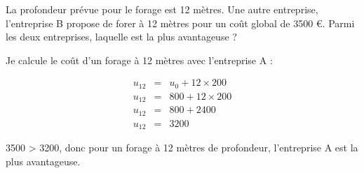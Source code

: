 \documentclass[a4paper,11pt]{exam}
\begin{document}
\begin{questions}
	
	\question La profondeur prévue pour le forage est 12 mètres. Une autre entreprise, l'entreprise B propose de forer à 12 mètres pour un coût global de \num{3500} €. Parmi les deux entreprises, laquelle est la plus avantageuse ?
		\begin{solution}
			Je calcule le coût d'un forage à 12 mètres avec l'entreprise A :
			
			\begin{eqnarray*}
				u_{12} &=& u_0 + 12 \times 200 \\
				u_{12} &=& 800 + 12 \times 200 \\
				u_{12} &=& 800 + 2400 \\
				u_{12} &=& 3200 
			\end{eqnarray*}
		
		3500 > 3200, donc pour un forage à 12 mètres de profondeur, l'entreprise A est la plus avantageuse.
		\end{solution}
	
\end{questions}
	\label{LastPage}
	
\end{document}
